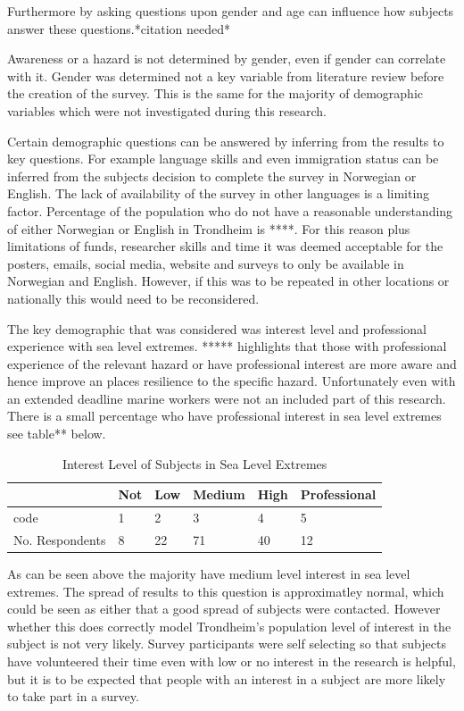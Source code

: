 Furthermore by asking questions upon gender and age can influence how subjects answer these questions.*citation needed*

Awareness or a hazard is not determined by gender, even if gender can correlate with it.  Gender was determined not a key variable from literature review before the creation of the survey. This is the same for the majority of demographic variables which were not investigated during this research.

Certain demographic questions can be answered by inferring from the results to key questions. For example language skills and even immigration status can be inferred from the subjects decision to complete the survey in Norwegian or English. The lack of availability of the survey in other languages is a limiting factor. Percentage of the population who do not have a reasonable understanding of either Norwegian or English in Trondheim is ****. For this reason plus limitations of funds, researcher skills and time it was deemed acceptable for the posters, emails, social media, website and surveys to only be available in Norwegian and English. However, if this was to be repeated in other locations or nationally this would need to be reconsidered. 

The key demographic that was considered was interest level and professional experience with sea level extremes. ***** highlights that those with professional experience of the relevant hazard or have professional interest are more aware and hence improve an places resilience to the specific hazard. Unfortunately even with an extended deadline marine workers were not an included part of this research. There is a small percentage who have professional interest in sea level extremes see table** below. 

\begin{table}[!ht]
    \centering
    \begin{tabular}{|l|l|l|l|l|l|}
    \hline
       & Not & Low & Medium & High & Professional \\ \hline
       code & 1 & 2 & 3 & 4 & 5 \\ \hline
        No. Respondents & 8 & 22 & 71 & 40 & 12 \\ \hline
    \end{tabular}
    \caption{Interest Level of Subjects in Sea Level Extremes}
    \label{interest_level_table}
\end{table}

As can be seen above the majority have medium level interest in sea level extremes. The spread of results to this question is approximatley normal, which could be seen as either that a good spread of subjects were contacted. However whether this does correctly model Trondheim's population level of interest in the subject is not very likely.  Survey participants were self selecting so that subjects have volunteered their time even with low or no interest in the research is helpful, but it is to be expected that people with an interest in a subject are more likely to take part in a survey.

